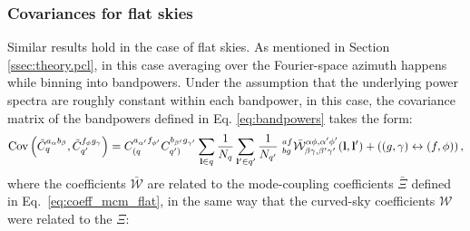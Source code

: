 \documentclass[a4paper,11pt]{article}
\begin{document}
      \subsubsection{Covariances for flat skies}
        Similar results hold in the case of flat skies. As mentioned in
        Section \ref{ssec:theory.pcl}, in this case averaging over the
        Fourier-space azimuth happens while binning into bandpowers. Under the
        assumption that the underlying power spectra are roughly constant
        within each bandpower, in this case, the covariance matrix of the bandpowers defined in Eq. \ref{eq:bandpowers} takes the form:
        \begin{equation}\label{eq:cov_flat}
          {\rm Cov}\left(\tilde{C}^{a_\alpha b_\beta}_q,\tilde{C}^{f_\phi g_\gamma}_{q'}\right) = C^{a_{\alpha'} f_{\phi'}}_{(q}C^{b_{\beta'} g_{\gamma'}}_{q')}\sum_{{\bf l}\in q} \frac{1}{N_q} \sum_{{\bf l}' \in q'} \frac{1}{N_{q'}}\,\,^{af}_{bg}\bar{\mathcal{W}}^{\alpha\phi,\alpha'\phi'}_{\beta\gamma,\beta'\gamma'}({\bf l},{\bf l}')+\left((g,\gamma)\leftrightarrow(f,\phi)\right),
        \end{equation}
        where the coefficients $\bar{\mathcal{W}}$ are related to the
        mode-coupling coefficients $\bar{\Xi}$ defined in
        Eq.~\ref{eq:coeff_mcm_flat}, in the same way that the curved-sky coefficients $\mathcal{W}$ were related to the $\Xi$:
\end{document}
